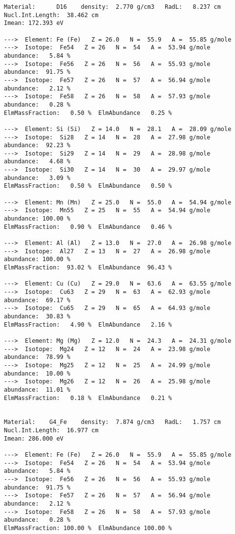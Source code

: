 {\begin{verbatim}
Material:      D16    density:  2.770 g/cm3   RadL:   8.237 cm   Nucl.Int.Length:  38.462 cm 
Imean: 172.393 eV 

--->  Element: Fe (Fe)   Z = 26.0   N =  55.9   A =  55.85 g/mole
--->  Isotope:  Fe54   Z = 26   N =  54   A =  53.94 g/mole   abundance:   5.84 %
--->  Isotope:  Fe56   Z = 26   N =  56   A =  55.93 g/mole   abundance:  91.75 %
--->  Isotope:  Fe57   Z = 26   N =  57   A =  56.94 g/mole   abundance:   2.12 %
--->  Isotope:  Fe58   Z = 26   N =  58   A =  57.93 g/mole   abundance:   0.28 %
ElmMassFraction:   0.50 %  ElmAbundance   0.25 % 

--->  Element: Si (Si)   Z = 14.0   N =  28.1   A =  28.09 g/mole
--->  Isotope:  Si28   Z = 14   N =  28   A =  27.98 g/mole   abundance:  92.23 %
--->  Isotope:  Si29   Z = 14   N =  29   A =  28.98 g/mole   abundance:   4.68 %
--->  Isotope:  Si30   Z = 14   N =  30   A =  29.97 g/mole   abundance:   3.09 %
ElmMassFraction:   0.50 %  ElmAbundance   0.50 % 

--->  Element: Mn (Mn)   Z = 25.0   N =  55.0   A =  54.94 g/mole
--->  Isotope:  Mn55   Z = 25   N =  55   A =  54.94 g/mole   abundance: 100.00 %
ElmMassFraction:   0.90 %  ElmAbundance   0.46 % 

--->  Element: Al (Al)   Z = 13.0   N =  27.0   A =  26.98 g/mole
--->  Isotope:  Al27   Z = 13   N =  27   A =  26.98 g/mole   abundance: 100.00 %
ElmMassFraction:  93.02 %  ElmAbundance  96.43 % 

--->  Element: Cu (Cu)   Z = 29.0   N =  63.6   A =  63.55 g/mole
--->  Isotope:  Cu63   Z = 29   N =  63   A =  62.93 g/mole   abundance:  69.17 %
--->  Isotope:  Cu65   Z = 29   N =  65   A =  64.93 g/mole   abundance:  30.83 %
ElmMassFraction:   4.90 %  ElmAbundance   2.16 % 

--->  Element: Mg (Mg)   Z = 12.0   N =  24.3   A =  24.31 g/mole
--->  Isotope:  Mg24   Z = 12   N =  24   A =  23.98 g/mole   abundance:  78.99 %
--->  Isotope:  Mg25   Z = 12   N =  25   A =  24.99 g/mole   abundance:  10.00 %
--->  Isotope:  Mg26   Z = 12   N =  26   A =  25.98 g/mole   abundance:  11.01 %
ElmMassFraction:   0.18 %  ElmAbundance   0.21 % 


Material:    G4_Fe    density:  7.874 g/cm3   RadL:   1.757 cm   Nucl.Int.Length:  16.977 cm 
Imean: 286.000 eV 

--->  Element: Fe (Fe)   Z = 26.0   N =  55.9   A =  55.85 g/mole
--->  Isotope:  Fe54   Z = 26   N =  54   A =  53.94 g/mole   abundance:   5.84 %
--->  Isotope:  Fe56   Z = 26   N =  56   A =  55.93 g/mole   abundance:  91.75 %
--->  Isotope:  Fe57   Z = 26   N =  57   A =  56.94 g/mole   abundance:   2.12 %
--->  Isotope:  Fe58   Z = 26   N =  58   A =  57.93 g/mole   abundance:   0.28 %
ElmMassFraction: 100.00 %  ElmAbundance 100.00 % 



\end{verbatim}}
